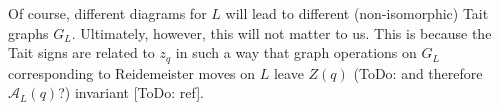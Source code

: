 \begin{remark}
	Of course, different diagrams for $L$ will lead to different (non-isomorphic) Tait graphs $G_L$. Ultimately, however, this will not matter to us. This is because the Tait signs are related to $z_q$ in such a way that graph operations on $G_L$ corresponding to Reidemeister moves on $L$ leave $Z(q)$ (ToDo: and therefore $\mathcal{A}_L(q)$?) invariant [ToDo: ref].
\end{remark}











